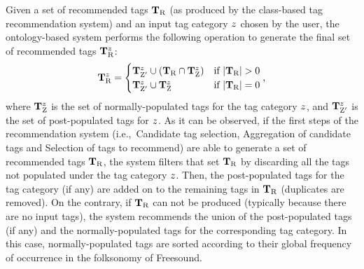 Given a set of recommended tags $\mathbf{T}_{\text{R}}$ (as produced by the class-based tag recommendation system) and an input tag category $z$ chosen by the user, the ontology-based system performs the following operation to generate the final set of recommended tags $\mathbf{T}_{\text{R}}^z$:
\[ \mathbf{T}_{\text{R}}^z = \begin{cases} 
	\mathbf{T}^{z}_{\text{Z}^\prime} \cup (\mathbf{T}_{\text{R}} \cap \mathbf{T}^{z}_{\text{Z}}) & \text{if } |\mathbf{T}_{\text{R}}| > 0 \\
	\mathbf{T}^{z}_{\text{Z}^\prime} \cup \mathbf{T}^{z}_{\text{Z}} &\text{if } |\mathbf{T}_{\text{R}}| = 0 \\
\end{cases}\text{,} \]
where $\mathbf{T}^{z}_{\text{Z}}$ is the set of normally-populated tags for the tag category $z$, and $\mathbf{T}^{z}_{\text{Z}^\prime}$ is the set of post-populated tags for $z$. 
As it can be observed, if the first steps of the recommendation system (i.e.,~Candidate tag selection, Aggregation of candidate tags and Selection of tags to recommend) are able to generate a set of recommended tags $\mathbf{T}_{\text{R}}$, the system filters that set $\mathbf{T}_{\text{R}}$ by discarding all the tags not populated under the tag category $z$. Then, the post-populated tags for the tag category (if any) are added on to the remaining tags in $\mathbf{T}_{\text{R}}$ (duplicates are removed).
On the contrary, if $\mathbf{T}_{\text{R}}$ can not be produced (typically because there are no input tags), the system recommends the union of the post-populated tags (if any) and the normally-populated tags for the corresponding tag category. In this case, normally-populated tags are sorted according to their global frequency of occurrence in the folksonomy of Freesound.

